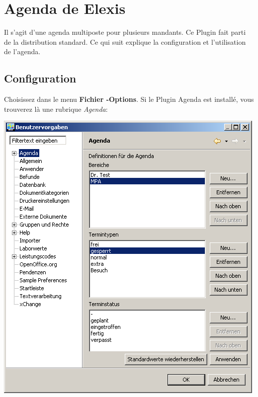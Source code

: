 
\section{Agenda de Elexis}\label{Agenda}
 Il s'agit d'une agenda multiposte pour plusieurs mandants. Ce Plugin fait parti de la distribution standard. Ce qui suit explique la configuration et l'utilisation de l'agenda.
\subsection{Configuration}


Choisissez dans le menu  \textbf{Fichier -Options}. Si le Plugin Agenda est installé, vous trouverez là une rubrique  \textit{Agenda}:




\includegraphics{images/settings1}

